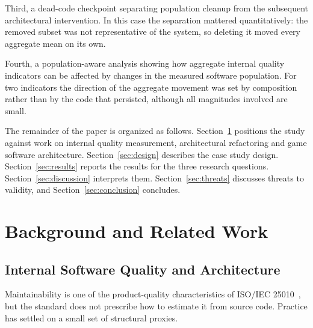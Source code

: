\documentclass{sbc2019}%
\begin{document}
Third, a dead-code checkpoint separating population cleanup from the subsequent
architectural intervention. In this case the separation mattered quantitatively:
the removed subset was not representative of the system, so deleting it moved
every aggregate mean on its own.

Fourth, a population-aware analysis showing how aggregate internal quality
indicators can be affected by changes in the measured software population. For
two indicators the direction of the aggregate movement was set by composition
rather than by the code that persisted, although all magnitudes involved are
small.

The remainder of the paper is organized as follows. Section~\ref{sec:related}
positions the study against work on internal quality measurement, architectural
refactoring and game software architecture. Section~\ref{sec:design} describes
the case study design. Section~\ref{sec:results} reports the results for the
three research questions. Section~\ref{sec:discussion} interprets them.
Section~\ref{sec:threats} discusses threats to validity, and
Section~\ref{sec:conclusion} concludes.


\section{Background and Related Work}\label{sec:related}

\subsection{Internal Software Quality and Architecture}

Maintainability is one of the product-quality characteristics of ISO/IEC 25010~\cite{iso25010}, but the standard does not prescribe how to estimate it from
source code. Practice has settled on a small set of structural proxies.
\end{document}
